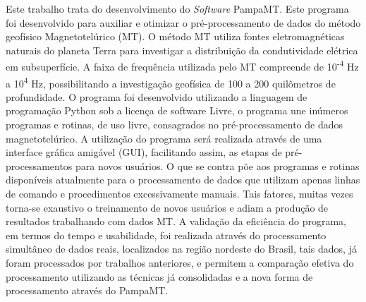 \documentclass[12pt,twoside,oneright,a4paper,chapter=TITLE,english,brazil]{unipampa}
\newcommand{\en}[1]{\textit{#1}}
\newcommand{\Software}{\en{Software}}
\begin{document}
\begin{resumo}
 Este trabalho trata do desenvolvimento do \Software{} PampaMT. Este programa foi desenvolvido para auxiliar e otimizar o pré-processamento de dados do método geofísico Magnetotelúrico (MT). O método MT utiliza fontes eletromagnéticas naturais do planeta Terra para investigar a distribuição da condutividade elétrica em subsuperfície. A faixa de frequência utilizada pelo MT compreende de 10\textsuperscript{-4} Hz a 10\textsuperscript{4} Hz, possibilitando a investigação geofísica de 100 a 200 quilômetros de profundidade. O programa foi desenvolvido utilizando a linguagem de programação Python sob a licença de software Livre, o programa une inúmeros programas e rotinas, de uso livre, consagrados no pré-processamento de dados magnetotelúrico. A utilização do programa será realizada através de uma interface gráfica amigável (GUI), facilitando assim, as etapas de pré-processamentos para novos usuários. O que se contra põe aos programas e rotinas disponíveis atualmente para o processamento de dados que utilizam apenas linhas de comando e procedimentos excessivamente manuais. Tais fatores, muitas vezes torna-se exaustivo o treinamento de novos usuários e adiam a produção de resultados trabalhando com dados MT. A validação da eficiência do programa, em termos do tempo e usabilidade, foi realizada através do processamento simultâneo de dados reais, localizados na região nordeste do Brasil, tais dados, já foram processados por trabalhos anteriores, e permitem a comparação efetiva do processamento utilizando as técnicas já consolidadas e a nova forma de processamento através do PampaMT.  
\end{resumo}
\end{document}
